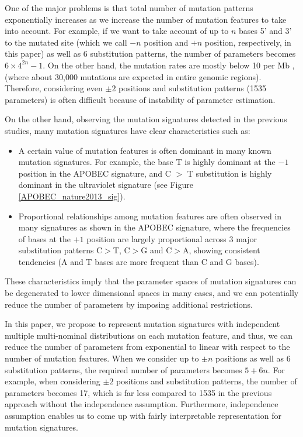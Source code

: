 One of the major problems is that 
total number of mutation patterns exponentially increases
as we increase the number of mutation features to take into account.
For example, if we want to take account of up to $n$ bases 5' and 3' to the mutated site 
(which we call $-n$ position and $+n$ position, respectively, in this paper) as well as 6 substitution patterns, 
the number of parameters becomes $6 \times 4^{2n} - 1$. 
On the other hand, the mutation rates are mostly below 10 per Mb \cite{pmid23945592},
(where about 30,000 mutations are expected in entire genomic regions).
Therefore, considering even $\pm 2$ positions and substitution patterns (1535 parameters)
is often difficult because of instability of parameter estimation. 


On the other hand, observing the mutation signatures detected in the previous studies, 
many mutation signatures have clear characteristics such as:
\begin{itemize}
\item 
A certain value of mutation features is often dominant in many known mutation signatures. 
For example, the base T is highly dominant at the $-1$ position in the APOBEC signature, 
and C $>$ T substitution is highly dominant in the ultraviolet signature \cite{pmid23945592} (see Figure \ref{APOBEC_nature2013_sig}). 

\item
Proportional relationships among mutation features are often observed in many signatures as shown in the APOBEC signature, 
where the frequencies of bases at the $+1$ position are largely proportional across 3 major substitution patterns C$>$T, C$>$G and C$>$A,
showing consistent tendencies  (A and T bases are more frequent than C and G bases).

\end{itemize} 

These characteristics imply that the parameter spaces of mutation signatures can be degenerated to lower dimensional spaces in many cases, 
and we can potentially reduce the number of parameters by imposing additional restrictions. 

In this paper, we propose to represent mutation signatures with independent multiple multi-nominal distributions
on each mutation feature,
and thus, we can reduce the number of parameters from exponential to linear with respect to the number of mutation features. 
When we consider up to $\pm n$ positions as well as 6 substitution patterns, 
the required number of parameters becomes $5 + 6n$. 
For example, when considering $\pm 2$ positions and substitution patterns,
the number of parameters becomes 17, which is far less compared to 1535 in the previous approach without the independence assumption.
Furthermore, independence assumption enables us to come up with fairly interpretable representation for mutation signatures.

